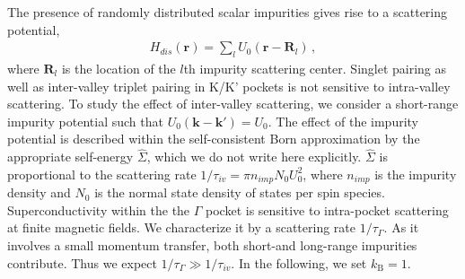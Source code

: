 \documentclass[showpacs,superscriptaddress,onecolumn,prb]{revtex4}
\begin{document}


The presence of randomly
distributed scalar impurities gives rise to a scattering potential,
\begin{align}
H_{dis}(\mathbf{r}) = \sum_{l} U_0(\mathbf{r} - \mathbf{R}_l)    \, ,   
\end{align}
where $\mathbf{R}_l$ is the location of the $l$th impurity scattering center. 
Singlet pairing as well as inter-valley triplet pairing in K/K' pockets is not sensitive to intra-valley scattering. 
To study the effect of inter-valley scattering, we consider a short-range impurity potential such that $U_{0}\left(\mathbf{k}-\mathbf{k}'\right)=U_{0}$. The effect of the impurity potential is described within the self-consistent Born approximation by the appropriate self-energy $\hat{\Sigma}$, which we do not write here explicitly. $\hat{\Sigma}$ is proportional to the scattering rate $1/\tau_{iv}=\pi n_{imp}N_{0}U_{0}^{2}$, where $n_{imp}$ is the impurity density and  $N_{0}$ is the normal state density of states per spin species. Superconductivity within the the $\Gamma$ pocket is sensitive to intra-pocket scattering at finite magnetic fields. We characterize it by a  scattering rate $1/\tau_\Gamma$. As it involves a small momentum transfer, both short-and long-range impurities contribute. Thus we expect $1/\tau_\Gamma\gg1/\tau_{iv}$. In the following, we set $k_{\mathrm{B}}=1$.
\end{document}
